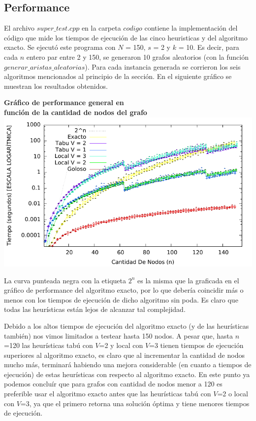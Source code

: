 \subsection{Performance}

\par{El archivo $super\_test.cpp$ en la carpeta $codigo$ contiene la
implementación del código que mide los tiempos de ejecución de las cinco
heuristicas y del algoritmo exacto. Se ejecutó este programa con $N$ =
150, $s$ = 2 y $k$ = 10. Es decir, para cada $n$ entero par entre 2 y 150, se
generaron 10 grafos aleatorios (con la función $generar\_aristas\_aleatorias$).
Para cada instancia generada se corrieron los seis algoritmos mencionados al
principio de la sección.
En el siguiente gráfico se muestran los resultados obtenidos.}
\newpage
\begin{center}
\textbf{Gráfico de performance general en\\función de la cantidad
de nodos del grafo}
\includegraphics[scale=1.3]{imgs/super_test_150_2_10.pdf}
\end{center}

\par{La curva punteada negra con la etiqueta $2^n$ es la misma que la
graficada en el gráfico de performance del algoritmo exacto, por lo que
debería coincidir más o menos con los tiempos de ejecución de dicho
algoritmo sin poda. Es claro que todas las heurísticas están lejos de alcanzar
tal complejidad.}\\

\par{Debido a los altos tiempos de ejecución del algoritmo exacto (y de las
heurísticas también) nos vimos limitados a testear hasta 150 nodos. A pesar que,
hasta $n$=120 las heurísticas tabú con $V$=2 y local con $V$=3 tienen tiempos de
ejecución superiores al algoritmo exacto, es claro que al incrementar la
cantidad de nodos mucho más, terminará habiendo una mejora considerable (en
cuanto a tiempos de ejecución) de estas heurísticas con respecto al algoritmo
exacto. En este punto ya podemos concluír que para grafos con cantidad de nodos
menor a 120 es preferible usar el algoritmo exacto antes que las heurísticas
tabú con $V$=2 o local con $V$=3, ya que el primero retorna una solución óptima
y tiene menores tiempos de ejecución.}\\


